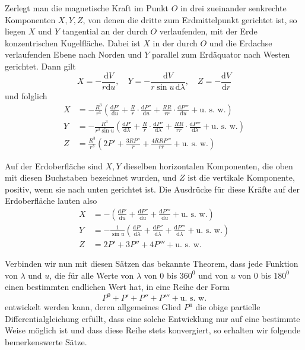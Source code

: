 Zerlegt man die magnetische Kraft im Punkt $O$ in drei zueinander senkrechte Komponenten $X,Y,Z$, von denen die dritte zum Erdmittelpunkt gerichtet ist, so liegen $X$ und $Y$ tangential an der durch $O$ verlaufenden, mit der Erde konzentrischen Kugelfläche. Dabei ist $X$ in der durch $O$ und die Erdachse verlaufenden Ebene nach Norden und $Y$ parallel zum Erdäquator nach Westen gerichtet. Dann gilt
\[
X=-\frac{\mathrm{d}V}{r\mathrm{d}u},\quad Y=-\frac{\mathrm{d}V}{r\sin u\,\mathrm{d}\lambda},\quad Z=-\frac{\mathrm{d}V}{\mathrm{d}r}
\]
und folglich
\[
\begin{aligned}
X&=-\frac{R^3}{r^3}\left(\frac{\mathrm{d}P'}{\mathrm{d}u}+\frac Rr\cdot\frac{\mathrm{d}P''}{\mathrm{d}u}+\frac{RR}{rr}\cdot\frac{\mathrm{d}P'''}{\mathrm{d}u}+\text{u. s. w.}\right)\\
Y&=-\frac{R^3}{r^3\sin u}\left(\frac{\mathrm{d}P'}{\mathrm{d}\lambda}+\frac Rr\cdot\frac{\mathrm{d}P''}{\mathrm{d}\lambda}+\frac{RR}{rr}\cdot\frac{\mathrm{d}P'''}{\mathrm{d}\lambda}+\text{u. s. w.}\right)\\
Z&=\frac{R^3}{r^3}\left(2P'+\frac{3RP''}{r}+\frac{4RRP'''}{rr}+\text{u. s. w.}\right)
\end{aligned}
\]

Auf der Erdoberfläche sind $X,Y$ dieselben horizontalen Komponenten, die oben mit diesen Buchstaben bezeichnet wurden, und $Z$ ist die vertikale Komponente, positiv, wenn sie nach unten gerichtet ist. Die Ausdrücke für diese Kräfte auf der Erdoberfläche lauten also
\[
\begin{aligned}
X&=-\left(\frac{\mathrm{d}P'}{\mathrm{d}u}+\frac{\mathrm{d}P''}{\mathrm{d}u}+\frac{\mathrm{d}P'''}{\mathrm{d}u}+\text{u. s. w.}\right)\\
Y&=-\frac1{\sin u}\left(\frac{\mathrm{d}P'}{\mathrm{d}\lambda}+\frac{\mathrm{d}P''}{\mathrm{d}\lambda}+\frac{\mathrm{d}P'''}{\mathrm{d}\lambda}+\text{u. s. w.}\right)\\
Z&=2P'+3P''+4P'''+\text{u. s. w.}
\end{aligned}
\]

Verbinden wir nun mit diesen Sätzen das bekannte Theorem, dass jede Funktion von $\lambda$ und $u$, die für alle Werte von $\lambda$ von $0$ bis $360^0$ und von $u$ von $0$ bis $180^0$ einen bestimmten endlichen Wert hat, in eine Reihe der Form
\[
P^0+P'+P''+P'''+\text{u. s. w.}
\]
entwickelt werden kann, deren allgemeines Glied $P^{\mathrm{n}}$ die obige partielle Differentialgleichung erfüllt, dass eine solche Entwicklung nur auf eine bestimmte Weise möglich ist und dass diese Reihe stets konvergiert, so erhalten wir folgende bemerkenswerte Sätze.


